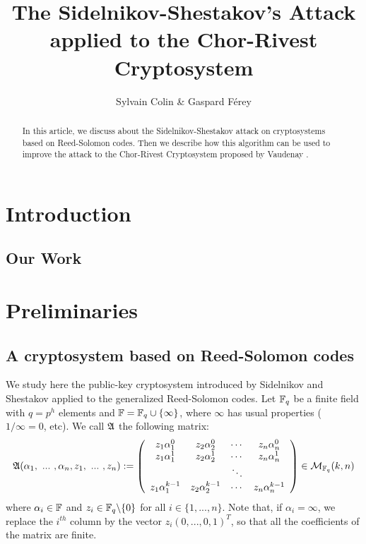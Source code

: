 \documentclass[12pt,a4paper,titlepage]{article}
\author{Sylvain Colin \& Gaspard Férey}
\title{The Sidelnikov-Shestakov's Attack applied to the Chor-Rivest Cryptosystem}
\begin{document}
\maketitle
\tableofcontents


\begin{abstract}

In this article, we discuss about the Sidelnikov-Shestakov attack on cryptosystems based on Reed-Solomon codes. Then we describe how this algorithm can be used to improve the attack to the Chor-Rivest Cryptosystem proposed by Vaudenay \cite{Vau01}.

\end{abstract}



\newpage
\section{Introduction}
\label{sec:intro}



\subsection{Our Work}




\newpage
\section{Preliminaries}
\label{sec:Prel}


\subsection{A cryptosystem based on Reed-Solomon codes}

We study here the public-key cryptosystem introduced by Sidelnikov and Shestakov \cite{SidelShes92} applied to the generalized Reed-Solomon codes. Let $\mathbb{F}_q$ be a finite field with $q = p^h$ elements and $\mathbb{F} = \mathbb{F}_q \cup \{ \infty \}$, where $\infty$ has usual properties ( $1/\infty = 0$, etc). We call $\mathfrak{A}$ the following matrix:
$$ \mathfrak{A}(\alpha_1, \ ... \ , \alpha_n, z_1, \ ... \ , z_n) := \left(
\begin{array}{cccc}
z_1 \alpha_1^0 &  z_2 \alpha_2^0 & \cdots & z_n \alpha_n^0 \\
z_1 \alpha_1^1 &  z_2 \alpha_2^1 & \cdots & z_n \alpha_n^1 \\
 & & \ddots & \\
z_1 \alpha_1^{k-1} &  z_2 \alpha_2^{k-1} & \cdots & z_n \alpha_n^{k-1}
\end{array}
\right) \in \mathcal{M}_{\mathbb{F}_q}(k,n) $$
where $\alpha_i \in \mathbb{F}$ and $z_i \in \mathbb{F}_q\backslash\{0\}$ for all $i \in \{1,...,n\}$. Note that, if $\alpha_i = \infty$, we replace the $i^{th}$ column by the vector $z_i(0,...,0,1)^T$, so that all the coefficients of the matrix are finite.
\end{document}
